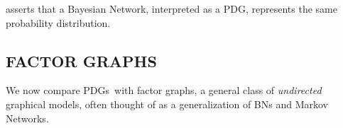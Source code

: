 \documentclass{article}
\newcommand{\MN}{PDG}
\newcommand{\MNs}{\MN s}
\numberwithin{equation}{section}
\begin{document}
\begin{notfocus}
	 asserts that a Bayesian Network, interpreted as a \MN, represents the same probability distribution.
	

	
	
	
\end{notfocus}
	
	\setcounter{section}{4}
	\subsection{FACTOR GRAPHS} \label{sec:factor-graphs}


	
	
	We now compare \MNs\ with factor graphs, a general class of \emph{undirected} graphical models, often thought of as a generalization of BNs and Markov Networks.
	
\end{document}
